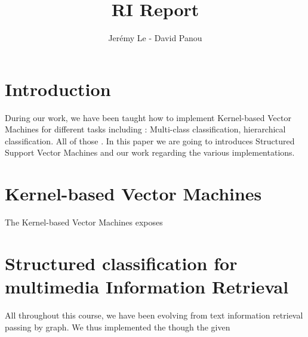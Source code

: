 \documentclass[a4paper,10pt]{article}
\title{RI Report}
\author{Jerémy Le - David Panou}
\begin{document}
\maketitle
\section{Introduction}

During our work, we have been taught how to implement Kernel-based Vector Machines for different tasks including : Multi-class classification, hierarchical classification. All of those . In this paper we are going to introduces Structured Support Vector Machines and our work regarding the various implementations.

\section{Kernel-based Vector Machines}

The Kernel-based Vector Machines \cite{} exposes 

\section{Structured classification for multimedia Information Retrieval}

All throughout this course, we have been evolving from text information retrieval passing by graph.
We thus implemented the though the given 

\


\medskip

\begin{thebibliography}{9}

\bibitem{}

\end{thebibliography}
\end{document}
